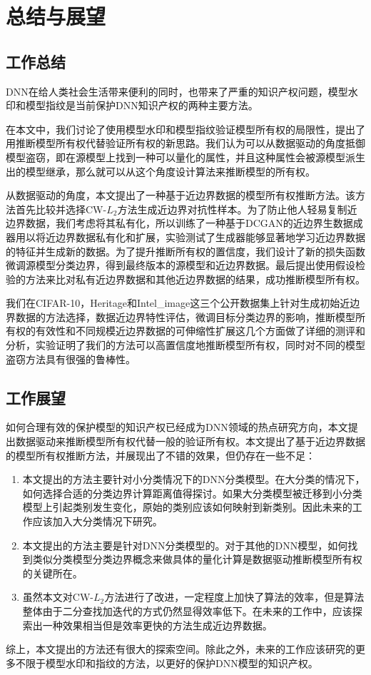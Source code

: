 \chapter{总结与展望}\label{6}


\section{工作总结}

DNN在给人类社会生活带来便利的同时，也带来了严重的知识产权问题，模型水印和模型指纹是当前保护DNN知识产权的两种主要方法。

在本文中，我们讨论了使用模型水印和模型指纹验证模型所有权的局限性，提出了用推断模型所有权代替验证所有权的新思路。我们认为可以从数据驱动的角度抵御模型盗窃，即在源模型上找到一种可以量化的属性，并且这种属性会被源模型派生出的模型继承，那么就可以从这个角度设计算法来推断模型的所有权。

从数据驱动的角度，本文提出了一种基于近边界数据的模型所有权推断方法。该方法首先比较并选择CW-$L_2$方法生成近边界对抗性样本。为了防止他人轻易复制近边界数据，我们考虑将其私有化，所以训练了一种基于DCGAN的近边界生数据成器用以将近边界数据私有化和扩展，实验测试了生成器能够显著地学习近边界数据的特征并生成新的数据。为了提升推断所有权的置信度，我们设计了新的损失函数微调源模型分类边界，得到最终版本的源模型和近边界数据。最后提出使用假设检验的方法来比对私有近边界数据和其他近边界数据的结果，成功推断模型所有权。

我们在CIFAR-10，Heritage和Intel\_image这三个公开数据集上针对生成初始近边界数据的方法选择，数据近边界特性评估，微调目标分类边界的影响，推断模型所有权的有效性和不同规模近边界数据的可伸缩性扩展这几个方面做了详细的测评和分析，实验证明了我们的方法可以高置信度地推断模型所有权，同时对不同的模型盗窃方法具有很强的鲁棒性。



\section{工作展望}

如何合理有效的保护模型的知识产权已经成为DNN领域的热点研究方向，本文提出数据驱动来推断模型所有权代替一般的验证所有权。本文提出了基于近边界数据的模型所有权推断方法，并展现出了不错的效果，但仍存在一些不足：

\begin{enumerate}
	\renewcommand{\labelenumi}{\theenumi)}
	\item 本文提出的方法主要针对小分类情况下的DNN分类模型。在大分类的情况下，如何选择合适的分类边界计算距离值得探讨。如果大分类模型被迁移到小分类模型上引起类别发生变化，原始的类别应该如何映射到新类别。因此未来的工作应该加入大分类情况下研究。
	\item 本文提出的方法主要是针对DNN分类模型的。对于其他的DNN模型，如何找到类似分类模型分类边界概念来做具体的量化计算是数据驱动推断模型所有权的关键所在。
	\item 虽然本文对CW-$L_2$方法进行了改进，一定程度上加快了算法的效率，但是算法整体由于二分查找加迭代的方式仍然显得效率低下。在未来的工作中，应该探索出一种效果相当但是效率更快的方法生成近边界数据。
\end{enumerate}

综上，本文提出的方法还有很大的探索空间。除此之外，未来的工作应该研究的更多不限于模型水印和指纹的方法，以更好的保护DNN模型的知识产权。





